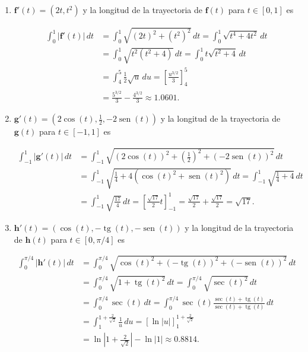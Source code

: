 \documentclass[
  a4paper,
]{scrreport}
\theoremstyle{definition}
\theoremstyle{remark}
\begin{document}
\begin{tcolorbox}[enhanced jigsaw, coltitle=black, toptitle=1mm, colframe=quarto-callout-tip-color-frame, colbacktitle=quarto-callout-tip-color!10!white, breakable, opacityback=0, bottomtitle=1mm, opacitybacktitle=0.6, title=\textcolor{quarto-callout-tip-color}{\faLightbulb}\hspace{0.5em}{Solución}, arc=.35mm, leftrule=.75mm, toprule=.15mm, titlerule=0mm, bottomrule=.15mm, left=2mm, rightrule=.15mm, colback=white]

\begin{enumerate}
\def\labelenumi{\alph{enumi}.}
\item
  \(\mathbf{f}'(t) = (2t, t^2)\) y la longitud de la trayectoria de
  \(\mathbf{f}(t)\) para \(t\in[0,1]\) es

  \begin{align*}
  \int_0^1 |\mathbf{f}'(t)|\,dt 
  &= \int_0^1 \sqrt{(2t)^2+(t^2)^2}\, dt
  = \int_0^1 \sqrt{t^4+4t^2}\, dt \\
  &= \int_0^1 \sqrt{t^2(t^2+4)}\, dt
  = \int_0^1 t\sqrt{t^2+4}\,dt \\
  &= \int_4^5 \frac{1}{2} \sqrt{u}\, du 
  = \left[\frac{u^{3/2}}{3}\right]_4^5 \tag{$u=t^2+4$} \\
  &= \frac{5^{3/2}}{3}-\frac{4^{3/2}}{3}
  \approx 1.0601.
  \end{align*}
\item
  \(\mathbf{g}'(t) = (2\cos(t), \frac{1}{2}, -2\operatorname{sen}(t))\)
  y la longitud de la trayectoria de \(\mathbf{g}(t)\) para
  \(t\in[-1,1]\) es

  \begin{align*}
  \int_{-1}^1 |\mathbf{g}'(t)|\,dt 
  &= \int_{-1}^1 \sqrt{(2\cos(t))^2+\left(\frac{1}{2}\right)^2+(-2\operatorname{sen}(t))^2}\, dt \\
  &= \int_{-1}^1 \sqrt{\frac{1}{4}+4(\cos(t)^2+\operatorname{sen}(t)^2)}\, dt 
  = \int_{-1}^1 \sqrt{\frac{1}{4}+4}\, dt \\
  &= \int_{-1}^1 \sqrt{\frac{17}{4}}\, dt 
  = \left[\frac{\sqrt{17}}{2}t\right]_{-1}^1
  = \frac{\sqrt{17}}{2}+\frac{\sqrt{17}}{2}
  = \sqrt{17}.
  \end{align*}
\item
  \(\mathbf{h}'(t) = (\cos(t), -\operatorname{tg}(t), -\operatorname{sen}(t))\)
  y la longitud de la trayectoria de \(\mathbf{h}(t)\) para
  \(t\in[0,\pi/4]\) es

  \begin{align*}
  \int_0^{\pi/4} |\mathbf{h}'(t)|\,dt 
  &= \int_0^{\pi/4} \sqrt{\cos(t)^2+(-\operatorname{tg}(t))^2+(-\operatorname{sen}(t))^2}\, dt \\
  &= \int_0^{\pi/4} \sqrt{1+\operatorname{tg}(t)^2}\, dt 
  = \int_0^{\pi/4} \sqrt{\sec(t)^2}\, dt \\
  &= \int_0^{\pi/4} \sec(t)\, dt 
  = \int_0^{\pi/4} \sec(t)\frac{\sec(t)+\operatorname{tg}(t)}{\sec(t)+\operatorname{tg}(t)}\, dt \\
  &= \int_{1}^{1+\frac{2}{\sqrt{2}}} \frac{1}{u}\, du 
  = [\ln|u|]_1^{1+\frac{2}{\sqrt{2}}} \tag{1}\\
  &= \ln\left|1+\frac{2}{\sqrt{2}}\right|-\ln|1|
  \approx 0.8814.
  \end{align*}


\end{enumerate}
\end{tcolorbox}
\end{document}
